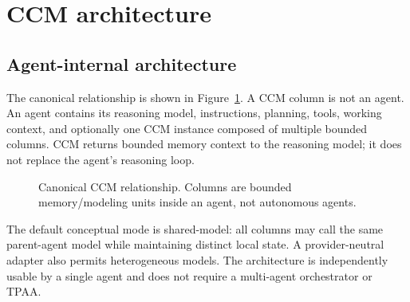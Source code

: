 \section{CCM architecture}

\subsection{Agent-internal architecture}

The canonical relationship is shown in Figure~\ref{fig:ccm-architecture}. A CCM column is not an agent. An agent contains its reasoning model, instructions, planning, tools, working context, and optionally one CCM instance composed of multiple bounded columns. CCM returns bounded memory context to the reasoning model; it does not replace the agent's reasoning loop.

\begin{figure}[t]
\centering
{}
\caption{Canonical CCM relationship. Columns are bounded memory/modeling units inside an agent, not autonomous agents.}
\label{fig:ccm-architecture}
\end{figure}

The default conceptual mode is shared-model: all columns may call the same parent-agent model while maintaining distinct local state. A provider-neutral adapter also permits heterogeneous models. The architecture is independently usable by a single agent and does not require a multi-agent orchestrator or TPAA.

